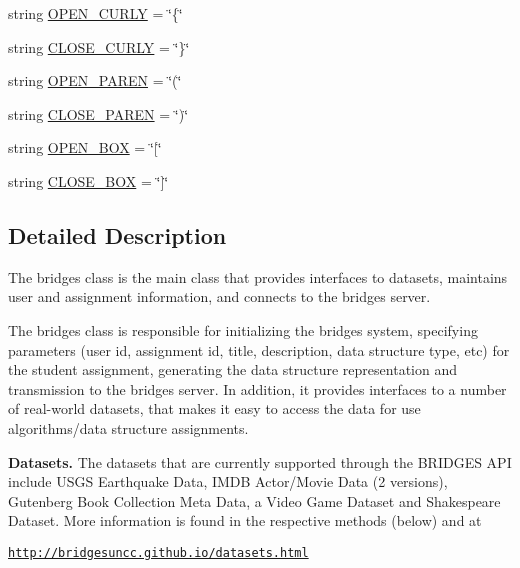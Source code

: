 \begin{DoxyCompactItemize}
\item 
string \hyperlink{classbridges_1_1bridges_1_1_bridges_aeff6b25536f3f082f36fa686e77b71dc}{O\+P\+E\+N\+\_\+\+C\+U\+R\+L\+Y} = \char`\"{}\{\char`\"{}
\item 
string \hyperlink{classbridges_1_1bridges_1_1_bridges_ad4114eb767040a15e8e959b8198f79df}{C\+L\+O\+S\+E\+\_\+\+C\+U\+R\+L\+Y} = \char`\"{}\}\char`\"{}
\item 
string \hyperlink{classbridges_1_1bridges_1_1_bridges_a6cd3867ef7ec0e65939a16d91e4084c8}{O\+P\+E\+N\+\_\+\+P\+A\+R\+E\+N} = \char`\"{}(\char`\"{}
\item 
string \hyperlink{classbridges_1_1bridges_1_1_bridges_ab81263e90b83977305b3e82cee097d8d}{C\+L\+O\+S\+E\+\_\+\+P\+A\+R\+E\+N} = \char`\"{})\char`\"{}
\item 
string \hyperlink{classbridges_1_1bridges_1_1_bridges_a8046e891d652ee83d3a8ec956c3508c5}{O\+P\+E\+N\+\_\+\+B\+O\+X} = \char`\"{}\mbox{[}\char`\"{}
\item 
string \hyperlink{classbridges_1_1bridges_1_1_bridges_a21d5443aceaf125512291f20b23d3af5}{C\+L\+O\+S\+E\+\_\+\+B\+O\+X} = \char`\"{}\mbox{]}\char`\"{}
\end{DoxyCompactItemize}


\subsection{Detailed Description}
The bridges class is the main class that provides interfaces to datasets, maintains user and assignment information, and connects to the bridges server. 

The bridges class is responsible for initializing the bridges system, specifying parameters (user id, assignment id, title, description, data structure type, etc) for the student assignment, generating the data structure representation and transmission to the bridges server. In addition, it provides interfaces to a number of real-\/world datasets, that makes it easy to access the data for use algorithms/data structure assignments. ~\newline


{\bfseries Datasets.} The datasets that are currently supported through the B\+R\+I\+D\+G\+E\+S A\+P\+I include U\+S\+G\+S Earthquake Data, I\+M\+D\+B Actor/\+Movie Data (2 versions), Gutenberg Book Collection Meta Data, a Video Game Dataset and Shakespeare Dataset. More information is found in the respective methods (below) and at 

\href{http://bridgesuncc.github.io/datasets.html}{\tt http\+://bridgesuncc.\+github.\+io/datasets.\+html} 

